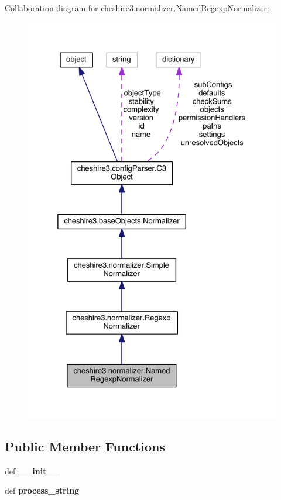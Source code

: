Collaboration diagram for cheshire3.\-normalizer.\-Named\-Regexp\-Normalizer\-:
\nopagebreak
\begin{figure}[H]
\begin{center}
\leavevmode
\includegraphics[width=328pt]{classcheshire3_1_1normalizer_1_1_named_regexp_normalizer__coll__graph}
\end{center}
\end{figure}
\subsection*{Public Member Functions}
\begin{DoxyCompactItemize}
\item 
\hypertarget{classcheshire3_1_1normalizer_1_1_named_regexp_normalizer_ae0dd6a69dd1cf0fc1ee255e55c5cc64f}{def {\bfseries \-\_\-\-\_\-init\-\_\-\-\_\-}}\label{classcheshire3_1_1normalizer_1_1_named_regexp_normalizer_ae0dd6a69dd1cf0fc1ee255e55c5cc64f}

\item 
\hypertarget{classcheshire3_1_1normalizer_1_1_named_regexp_normalizer_a1a08fff7e0f827c969d9f24c4a5bd17f}{def {\bfseries process\-\_\-string}}\label{classcheshire3_1_1normalizer_1_1_named_regexp_normalizer_a1a08fff7e0f827c969d9f24c4a5bd17f}

\end{DoxyCompactItemize}
